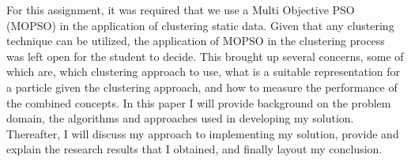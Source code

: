 \begin{flushleft}
For this assignment, it was required that we use a Multi Objective PSO (MOPSO) in the application of clustering static data. Given that any clustering technique can be utilized, the application of MOPSO in the clustering process was left open for the student to decide. This brought up several concerns, some of which are, which clustering approach to use, what is a suitable representation for a particle given the clustering approach, and how to measure the performance of the combined concepts. In this paper I will provide background on the problem domain, the algorithms and approaches used in developing my solution. Thereafter, I will discuss my approach to implementing my solution, provide and explain the research results that I obtained, and finally layout my conclusion.
\end{flushleft}